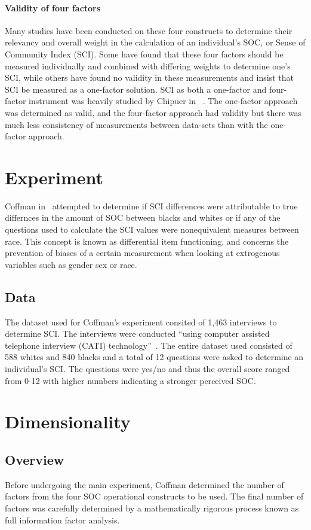 \documentclass{sig-alternate}
\begin{document}
\paragraph{Validity of four factors}
Many studies have been conducted on these four constructs to determine their relevancy and overall weight in the calculation of an individual's SOC, or Sense of Community Index (SCI). Some have found that these four factors should be measured individually and combined with differing weights to determine one's SCI, while others have found no validity in these measurements and insist that SCI be measured as a one-factor solution. SCI as both a one-factor and four-factor instrument was heavily studied by Chipuer in ~\cite{oneFactor:1999}. The one-factor approach was determined as valid, and the four-factor approach had validity but there was much less consistency of measurements between data-sets than with the one-factor approach.


\section{Experiment}
Coffman in~\cite{disparities:2009} attempted to determine if SCI differences were attributable to true differnces in the amount of SOC between blacks and whites or if any of the questions used to calculate the SCI values were nonequivalent measures between race. This concept is known as differential item functioning, and concerns the prevention of biases of a certain measurement when looking at extrogenous variables such as gender sex or race. 

\subsection{Data}
The dataset used for Coffman's experiment consited of 1,463 interviews to determine SCI. The interviews were conducted ``using computer assisted telephone interview (CATI) technology''~\cite{disparities:2009}. The entire dataset used consisted of 588 whites and 840 blacks and a total of 12 questions were asked to determine an individual's SCI. The questions were yes/no and thus the overall score ranged from 0-12 with higher numbers indicating a stronger perceived SOC. 

\section{Dimensionality}
\subsection{Overview}
Before undergoing the main experiment, Coffman determined the number of factors from the four SOC operational constructs to be used. The final number of factors was carefully determined by a mathematically rigorous process known as full information factor analysis. 
\end{document}
